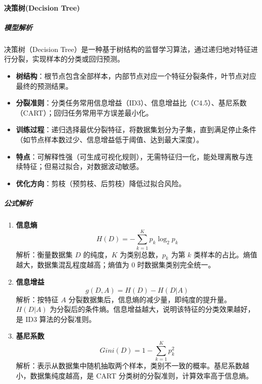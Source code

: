 \documentclass[12pt]{article}
\begin{document}
\paragraph{决策树(Decision Tree)}
\subparagraph{模型解析}
决策树（Decision Tree）是一种基于树结构的监督学习算法，通过递归地对特征进行分裂，实现样本的分类或回归预测。
\begin{itemize}[leftmargin=*]
    \item \textbf{树结构}：根节点包含全部样本，内部节点对应一个特征分裂条件，叶节点对应最终的预测结果。
    \item \textbf{分裂准则}：分类任务常用信息增益（ID3）、信息增益比（C4.5）、基尼系数（CART）；回归任务常用平方误差最小化。
    \item \textbf{训练过程}：递归选择最优分裂特征，将数据集划分为子集，直到满足停止条件（如节点样本数过少、信息增益低于阈值、达到最大深度）。
    \item \textbf{特点}：可解释性强（可生成可视化规则），无需特征归一化，能处理离散与连续特征；但易过拟合，对数据波动敏感。
    \item \textbf{优化方向}：剪枝（预剪枝、后剪枝）降低过拟合风险。
\end{itemize}

\subparagraph{公式解析}
\begin{enumerate}
    \item \textbf{信息熵}
    \[
    H(D) = -\sum_{k=1}^K p_k \log_2 p_k
    \]
    解析：衡量数据集 $D$ 的纯度，$K$ 为类别总数，$p_k$ 为第 $k$ 类样本的占比。熵值越大，数据集混乱程度越高；熵值为 0 时数据集类别完全统一。

    \item \textbf{信息增益}
    \[
    g(D,A) = H(D) - H(D|A)
    \]
    解析：按特征 $A$ 分裂数据集后，信息熵的减少量，即纯度的提升量。$H(D|A)$ 为分裂后的条件熵。信息增益越大，说明该特征的分类效果越好，是 ID3 算法的分裂准则。

    \item \textbf{基尼系数}
    \[
    Gini(D) = 1 - \sum_{k=1}^K p_k^2
    \]
    解析：表示从数据集中随机抽取两个样本，类别不一致的概率。基尼系数越小，数据集纯度越高，是 CART 分类树的分裂准则，计算效率高于信息熵。
\end{enumerate}
\end{document}
